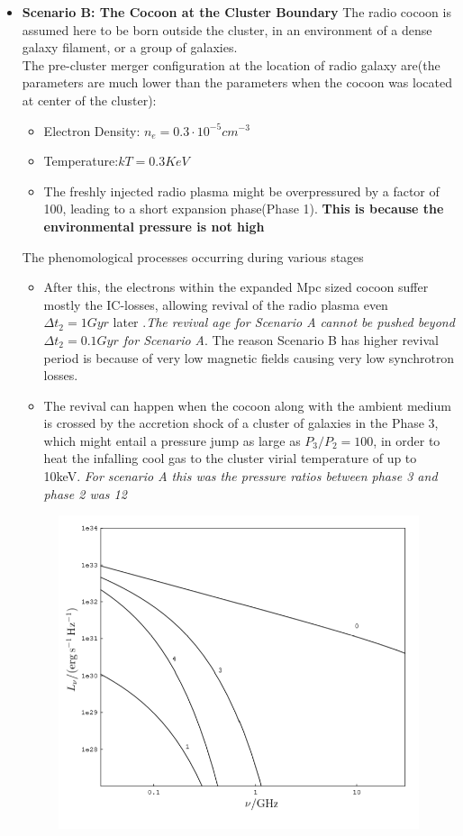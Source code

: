 \documentclass[12pt]{report}
\newcommand{\tbf}[1]{\textbf{#1}}
\newcommand{\tit}[1]{\textit{#1}}
\newcommand{\cbox}{tcolorbox}
\begin{document}
\begin{itemize}
\begin{itemize}
\begin{\cbox}
\end{\cbox}
\end{itemize}
\item \tbf{Scenario B: The Cocoon at the Cluster Boundary}
The radio cocoon is assumed here to be born outside the cluster, in an environment of a dense galaxy filament, or a group of galaxies.\\
The pre-cluster merger configuration at the location of radio galaxy are(the parameters are much lower than the parameters when the cocoon was located at center of the cluster):
\begin{itemize}
\item Electron Density: $n_e=0.3 \cdot 10^{-5}cm^{-3}$
\item Temperature:$kT=0.3KeV$
\item The freshly injected radio plasma might be overpressured by a factor of 100, leading to a short expansion phase(Phase 1). \tbf{This is because the environmental pressure is not high}
\end{itemize} 
The phenomological processes occurring during various stages
\begin{itemize}
\item After this, the electrons within the expanded Mpc sized cocoon suffer mostly the IC-losses, allowing revival of the radio plasma even $\Delta t_2 = 1Gyr$ later .\tit{The revival age for Scenario A cannot be pushed beyond $\Delta t_2=0.1 Gyr$ for Scenario A}. The reason Scenario B has higher revival period is because of very low magnetic fields causing very low synchrotron losses.
\item  The revival can happen when the cocoon along with the ambient medium is crossed by the accretion shock of a cluster of galaxies in the Phase 3, which might entail a pressure jump as large as $P_3/P_2 = 100$, in order to heat the infalling cool gas to the cluster virial temperature of up to 10keV. \tit{For scenario A this was the pressure ratios between phase 3 and phase 2 was 12}
\end{itemize} 
\begin{figure}[h!]\label{figsceB}
\includegraphics[scale=0.75]{figsceB.png}

\end{figure}
\end{itemize}
\end{document}
